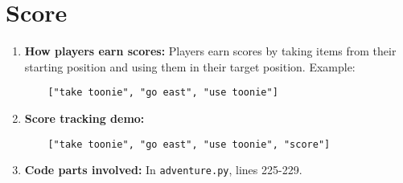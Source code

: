 \documentclass[11pt]{article}
\begin{document}
\section*{Score}
\begin{enumerate}
    \item \textbf{How players earn scores:}  
    Players earn scores by taking items from their starting position and using them in their target position.  
    Example:  
    \begin{verbatim}
    ["take toonie", "go east", "use toonie"]
    \end{verbatim}

    \item \textbf{Score tracking demo:}
    \begin{verbatim}
    ["take toonie", "go east", "use toonie", "score"]
    \end{verbatim}

    \item \textbf{Code parts involved:}  
    In \texttt{adventure.py}, lines 225-229.
\end{enumerate}
\end{document}
